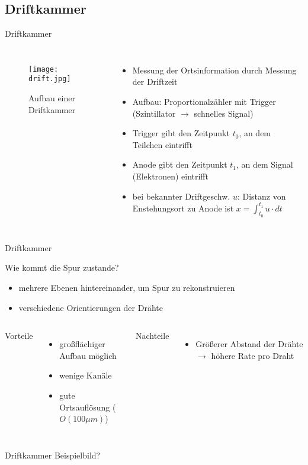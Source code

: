 \subsection[]{Driftkammer}

\begin{frame}{Driftkammer}
    \begin{columns}[T]
			\begin{figure}[htbp]
			  \centering
			  \texttt{[image: drift.jpg]}
			  \caption{Aufbau einer Driftkammer}
			\end{figure}
			
	    	\begin{itemize}
	    	  \item Messung der Ortsinformation durch Messung der Driftzeit
			  \item Aufbau: Proportionalzähler mit Trigger (Szintillator $\rightarrow$ schnelles Signal)
			  \item Trigger gibt den Zeitpunkt $t_0$, an dem Teilchen eintrifft
			  \item Anode gibt den Zeitpunkt $t_1$, an dem Signal (Elektronen) eintrifft
			  \item bei bekannter Driftgeschw. $u$: Distanz von Enstehungsort zu Anode ist
			  $x=\int_{t_0}^{t_1}u\cdot dt$
			\end{itemize}
			
    \end{columns}
\end{frame}

\begin{frame}{Driftkammer}

	\begin{block}{Wie kommt die Spur zustande?}
		\begin{itemize}
		  \item mehrere Ebenen hintereinander, um Spur zu rekonstruieren
		  \item verschiedene Orientierungen der Drähte
		\end{itemize}
	\end{block}
	\vspace{0.8cm}
    \begin{columns}[T]
			Vorteile		
			\begin{itemize}
			  \item großflächiger Aufbau möglich
			  \item wenige Kanäle
			  \item gute Ortsauflösung ($O(100\mu m)$)
			\end{itemize}	
	    	Nachteile
	    	\begin{itemize}
			  \item Größerer Abstand der Drähte $\rightarrow$ höhere Rate pro Draht 
			\end{itemize}
    \end{columns}
    \vspace{1cm}
\end{frame}

\begin{frame}{Driftkammer}
    Beispielbild?
\end{frame}